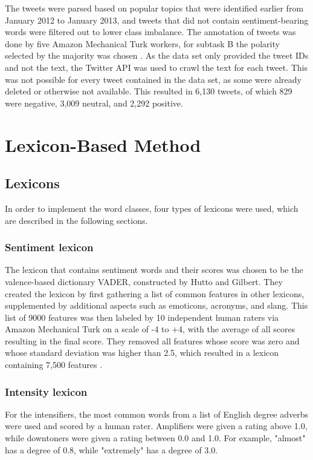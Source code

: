 The tweets were parsed based on popular topics that were identified earlier from January 2012 to January 2013, and tweets that did not contain sentiment-bearing words were filtered out to lower class imbalance. The annotation of tweets was done by five Amazon Mechanical Turk workers, for subtask B the polarity selected by the majority was chosen \cite{nakov-etal-2013-semeval}. As the data set only provided the tweet IDs and not the text, the Twitter API was used to crawl the text for each tweet. This was not possible for every tweet contained in the data set, as some were already deleted or otherwise not available. This resulted in 6,130 tweets, of which 829 were negative, 3,009 neutral, and 2,292 positive.

\section{Lexicon-Based Method}

\subsection{Lexicons}
In order to implement the word classes, four types of lexicons were used, which are described in the following sections.

\subsubsection{Sentiment lexicon}
The lexicon that contains sentiment words and their scores was chosen to be the valence-based dictionary VADER, constructed by Hutto and Gilbert. They created the lexicon by first gathering a list of common features in other lexicons, supplemented by additional aspects such as emoticons, acronyms, and slang. This list of 9000 features was then labeled by 10 independent human raters via Amazon Mechanical Turk on a scale of -4 to +4, with the average of all scores resulting in the final score. They removed all features whose score was zero and whose standard deviation was higher than 2.5, which resulted in a lexicon containing 7,500 features \cite{DBLP:conf/icwsm/HuttoG14}.

\subsubsection{Intensity lexicon}
For the intensifiers, the most common words from a list of English degree adverbs \cite{wiki:adverbs} were used and scored by a human rater. Amplifiers were given a rating above 1.0, while downtoners were given a rating between 0.0 and 1.0. For example, "almost" has a degree of 0.8, while "extremely" has a degree of 3.0.


